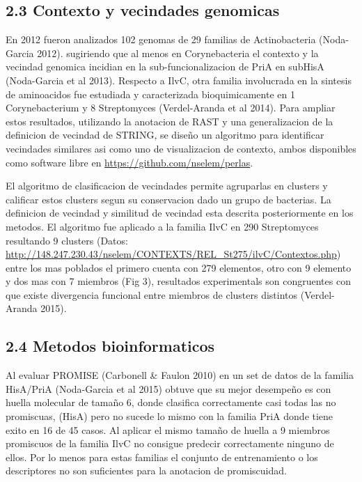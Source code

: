 \documentclass[12pt,twoside]{reedthesis}
\begin{document}
  \subsection{2.3 Contexto y vecindades
  genomicas}\label{contexto-y-vecindades-genomicas}
  
  En 2012 fueron analizados 102 genomas de 29 familias de Actinobacteria
  (Noda-Garcia 2012). sugiriendo que al menos en Corynebacteria el
  contexto y la vecindad genomica incidian en la sub-funcionalizacion de
  PriA en subHisA (Noda-Garcia et al 2013). Respecto a IlvC, otra familia
  involucrada en la sintesis de aminoacidos fue estudiada y caracterizada
  bioquimicamente en 1 Corynebacterium y 8 Streptomyces (Verdel-Aranda et
  al 2014). Para ampliar estos resultados, utilizando la anotacion de RAST
  y una generalizacion de la definicion de vecindad de STRING, se diseño
  un algoritmo para identificar vecindades similares asi como uno de
  visualizacion de contexto, ambos disponibles como software libre en
  \url{https://github.com/nselem/perlas}.
  
  El algoritmo de clasificacion de vecindades permite agruparlas en
  clusters y calificar estos clusters segun su conservacion dado un grupo
  de bacterias. La definicion de vecindad y similitud de vecindad esta
  descrita posteriormente en los metodos. El algoritmo fue aplicado a la
  familia IlvC en 290 Streptomyces resultando 9 clusters (Datos:
  \url{http://148.247.230.43/nselem/CONTEXTS/REL_St275/ilvC/Contextos.php})
  entre los mas poblados el primero cuenta con 279 elementos, otro con 9
  elemento y dos mas con 7 miembros (Fig 3), resultados experimentals son
  congruentes con que existe divergencia funcional entre miembros de
  clusters distintos (Verdel-Aranda 2015).
  
  \subsection{2.4 Metodos bioinformaticos}\label{metodos-bioinformaticos}
  
  Al evaluar PROMISE (Carbonell \& Faulon 2010) en un set de datos de la
  familia HisA/PriA (Noda-Garcia et al 2015) obtuve que su mejor desempeño
  es con huella molecular de tamaño 6, donde clasifica correctamente casi
  todas las no promiscuas, (HisA) pero no sucede lo mismo con la familia
  PriA donde tiene exito en 16 de 45 casos. Al aplicar el mismo tamaño de
  huella a 9 miembros promiscuos de la familia IlvC no consigue predecir
  correctamente ninguno de ellos. Por lo menos para estas familias el
  conjunto de entrenamiento o los descriptores no son suficientes para la
  anotacion de promiscuidad.
  
\end{document}
